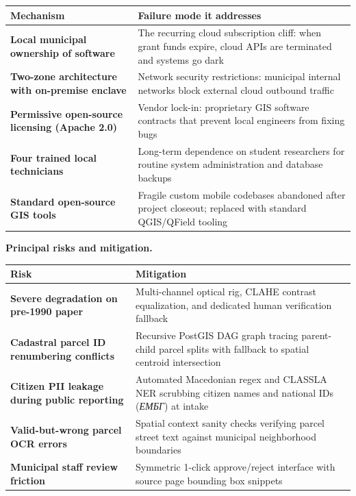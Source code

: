 \documentclass[9pt,a4paper]{article}
\begin{document}
\renewcommand{\arraystretch}{0.91}
\begin{tabularx}{\textwidth}{@{}lX@{}}
\toprule
\textsf{\textbf{\fontsize{8pt}{10pt}\selectfont Mechanism}} & \textsf{\textbf{\fontsize{8pt}{10pt}\selectfont Failure mode it addresses}} \\
\midrule
\textbf{Local municipal ownership of software} & The recurring cloud subscription cliff: when grant funds expire, cloud APIs are terminated and systems go dark \\
\textbf{Two-zone architecture with on-premise enclave} & Network security restrictions: municipal internal networks block external cloud outbound traffic \\
\textbf{Permissive open-source licensing (Apache 2.0)} & Vendor lock-in: proprietary GIS software contracts that prevent local engineers from fixing bugs \\
\textbf{Four trained local technicians} & Long-term dependence on student researchers for routine system administration and database backups \\
\textbf{Standard open-source GIS tools} & Fragile custom mobile codebases abandoned after project closeout; replaced with standard QGIS/QField tooling \\
\bottomrule
\end{tabularx}

\vspace{0.15em}
\textbf{Principal risks and mitigation.}
\vspace{0.1em}

\begin{tabularx}{\textwidth}{@{}lX@{}}
\toprule
\textsf{\textbf{\fontsize{8pt}{10pt}\selectfont Risk}} & \textsf{\textbf{\fontsize{8pt}{10pt}\selectfont Mitigation}} \\
\midrule
\textbf{Severe degradation on pre-1990 paper} & Multi-channel optical rig, CLAHE contrast equalization, and dedicated human verification fallback \\
\textbf{Cadastral parcel ID renumbering conflicts} & Recursive PostGIS DAG graph tracing parent-child parcel splits with fallback to spatial centroid intersection \\
\textbf{Citizen PII leakage during public reporting} & Automated Macedonian regex and CLASSLA NER scrubbing citizen names and national IDs (\textit{ЕМБГ}) at intake \\
\textbf{Valid-but-wrong parcel OCR errors} & Spatial context sanity checks verifying parcel street text against municipal neighborhood boundaries \\
\textbf{Municipal staff review friction} & Symmetric 1-click approve/reject interface with source page bounding box snippets \\
\bottomrule
\end{tabularx}
\end{document}
